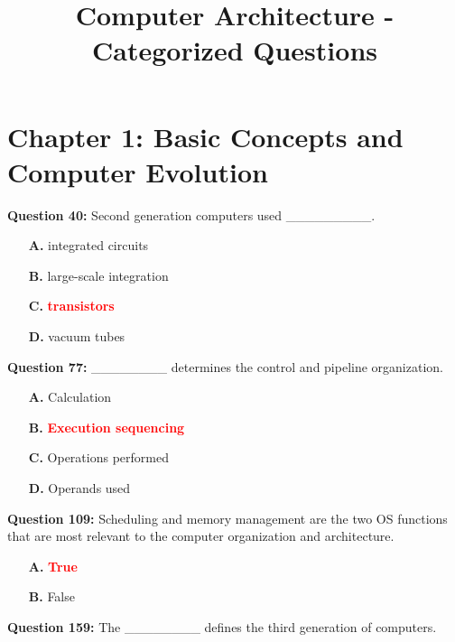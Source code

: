 \documentclass[12pt,a4paper]{article}
\begin{document}
\title{Computer Architecture - Categorized Questions}
\date{}
\maketitle
\tableofcontents
\newpage

\section{Chapter 1: Basic Concepts and Computer Evolution}

\textbf{Question 40:} Second generation computers used _________.

\begin{itemize}
    \item[\textbf{A.}] integrated circuits
    \item[\textbf{B.}] large-scale integration
    \item[\textbf{C.}] \textcolor{red}{\textbf{transistors}}
    \item[\textbf{D.}] vacuum tubes
\end{itemize}

\vspace{0.5cm}

\textbf{Question 77:} ________ determines the control and pipeline organization.

\begin{itemize}
    \item[\textbf{A.}] Calculation
    \item[\textbf{B.}] \textcolor{red}{\textbf{Execution sequencing}}
    \item[\textbf{C.}] Operations performed
    \item[\textbf{D.}] Operands used
\end{itemize}

\vspace{0.5cm}

\textbf{Question 109:} Scheduling and memory management are the two OS functions that are most relevant to the computer organization and architecture.

\begin{itemize}
    \item[\textbf{A.}] \textcolor{red}{\textbf{True}}
    \item[\textbf{B.}] False
\end{itemize}

\vspace{0.5cm}

\textbf{Question 159:} The ________ defines the third generation of computers.
\end{document}
